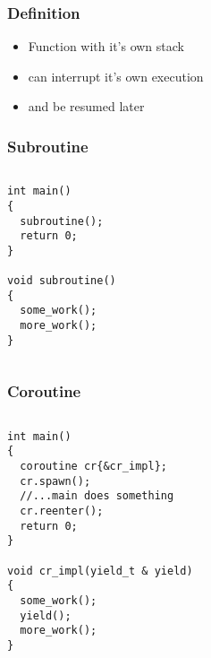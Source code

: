 \documentclass{beamer}
\begin{document}


\begin{frame}
\frametitle{Definition}

\begin{itemize}
\item<1-> Function with it's own stack
\item<2-> can interrupt it's own execution
\item<3-> and be resumed later
\end{itemize}
  
\end{frame}

\begin{frame}[fragile]
\frametitle{Subroutine}
\begin{columns}
\begin{column}{0.5\textwidth}
\begin{block}{}
\begin{lstlisting}
int main()
{
  subroutine();
  return 0;
}

void subroutine()
{
  some_work();
  more_work();
}
\end{lstlisting}
\end{block}
\end{column}
\begin{column}{0.5\textwidth}
\begin{adjustbox}{max totalsize={.9\textwidth}{.7\textheight},center}

\end{adjustbox}
\end{column}
\end{columns}
\end{frame}


\begin{frame}[fragile]
\frametitle{Coroutine}
\begin{columns}
\begin{column}{0.7\textwidth}
\begin{block}{}
\begin{lstlisting}
int main()
{
  coroutine cr{&cr_impl};
  cr.spawn();
  //...main does something
  cr.reenter();
  return 0;
}

void cr_impl(yield_t & yield)
{
  some_work();
  yield();
  more_work();
}
\end{lstlisting}
\end{block}
\end{column}
\begin{column}{0.3\textwidth}
\begin{adjustbox}{max totalsize={.9\textwidth}{.7\textheight},center}

\end{adjustbox}
\end{column}
\end{columns}
\end{frame}
\end{document}
